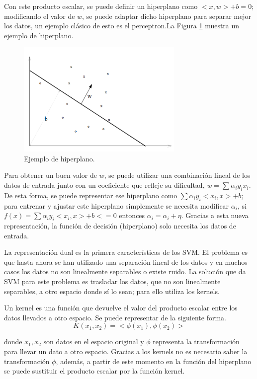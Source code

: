 Con este producto escalar, se puede definir un hiperplano como $<x,w> + b = 0$; modificando el valor de $w$, se puede adaptar dicho hiperplano para separar mejor los datos, un ejemplo clásico de esto es el perceptron.La Figura \ref{fig:214} muestra un ejemplo de hiperplano.\newline

\newpage
\begin{figure}[H]
	\centering
	\includegraphics[width=80mm]{imagenes/perceptron_example.png}
	\caption{Ejemplo de hiperplano.}
	\label{fig:214}
\end{figure}

Para obtener un buen valor de $w$, se puede utilizar una combinación lineal de los datos de entrada junto con un coeficiente que refleje su dificultad, $ w = \sum \alpha_i y_i x_i $. De esta forma, se puede representar ese hiperplano como $\sum \alpha_i y_i <x_i,x> + b$; para entrenar y ajustar este hiperplano simplemente se necesita modificar $\alpha_i$, si $f(x) = \sum \alpha_i y_i <x_i,x> + b <= 0$ entonces $\alpha_i = \alpha_i + \eta$. Gracias a esta nueva representación, la función de decisión (hiperplano) solo necesita los datos de entrada.\newline

La representación dual es la primera características de los SVM. El problema es que hasta ahora se han utilizado una separación lineal de los datos y en muchos casos los datos no son linealmente separables o existe ruido. La solución que da SVM para este problema es trasladar los datos, que no son linealmente separables, a otro espacio donde sí lo sean; para ello utiliza los kernels.\newline

Un kernel es una función que devuelve el valor del producto escalar entre los datos llevados a otro espacio. Se puede representar de la siguiente forma.
$$ K(x_1,x_2) = <\phi(x_1), \phi(x_2)> $$

\noindent donde $x_1, x_2$ son datos en el espacio original y $\phi$ representa la transformación para llevar un dato a otro espacio. Gracias a los kernels no es necesario saber la transformación $\phi$, además, a partir de este momento en la función del hiperplano se puede sustituir el producto escalar por la función kernel.\newline

